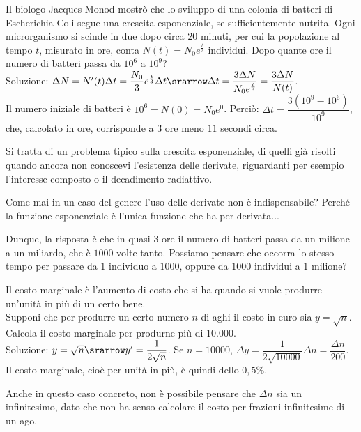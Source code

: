 \begin{esempio}
Il biologo Jacques Monod mostrò che lo sviluppo di una colonia di batteri di 
 Escherichia Coli segue una crescita esponenziale, se sufficientemente nutrita. 
 Ogni microrganismo si scinde in due dopo circa $20$ minuti, per cui la
 popolazione al tempo $t$, misurato in ore, conta $N(t)=N_0e^{\frac{t}{3}}$
 individui. Dopo quante ore il numero di batteri passa da $10^6$ a $10^9$?\\
 Soluzione: $\Delta N=N'(t)\Delta t=\dfrac{N_0}{3}e^{\frac{t}{3}}\Delta t
 \srarrow \Delta t=\dfrac{3\Delta N}{N_0e^{\frac{t}{3}}}=\dfrac{3\Delta N}
 {N(t)}$.\\
 Il numero iniziale di batteri è $10^6=N(0)=N_0e^0$. Perciò:
 $\Delta t=\dfrac{3(10^9-10^6)}{10^9}$, che, calcolato in ore, 
 corrisponde a 3 ore meno $11$ secondi circa.
 \begin{osservazione}
 Si tratta di un problema tipico sulla crescita esponenziale, di quelli già 
 risolti quando ancora non conoscevi l'esistenza delle derivate, riguardanti
 per esempio l'interesse composto o il decadimento radiattivo.
\end{osservazione}

\begin{osservazione}
 Come mai in un caso del genere l'uso delle derivate non è indispensabile? Perché
 la funzione esponenziale è l'unica funzione che ha per derivata...
\end{osservazione}

\begin{osservazione}
Dunque, la risposta è che in quasi $3$ ore il numero di batteri passa da un 
milione a un miliardo, che è $1000$ volte tanto. Possiamo pensare che occorra
lo stesso tempo per passare da $1$ individuo a $1000$, oppure da $1000$ 
individui a $1$ milione?
\end{osservazione}
\end{esempio}
 
\begin{esempio}
Il costo marginale è l'aumento di costo che si ha quando si vuole produrre 
un'unità in più di un certo bene.\\
Supponi che per produrre un certo numero $n$ di aghi il costo in euro sia
$y=\sqrt{n}$. Calcola il costo marginale per produrne più di $10.000$.\\
Soluzione: $y=\sqrt{n}\srarrow y'=\dfrac{1}{2\sqrt{n}}$.
Se $n=10000$, $\Delta y=\dfrac{1}{2\sqrt{10000}}\Delta n=\dfrac{\Delta n}{200}$.
Il costo marginale, cioè per unità in più, è quindi dello $0,5\%$.
\begin{osservazione}
 Anche in questo caso concreto, non è possibile pensare che $\Delta n$ sia un
 infinitesimo, dato che non ha senso calcolare il costo per frazioni 
 infinitesime di un ago.
\end{osservazione}
\end{esempio}
 
